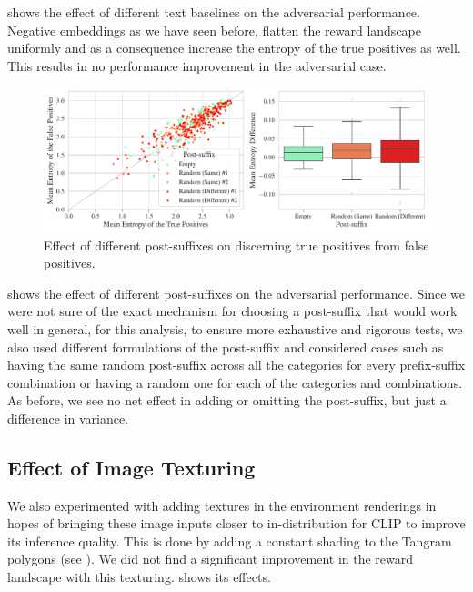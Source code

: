  shows the effect of different text baselines on the adversarial performance.
Negative embeddings as we have seen before, flatten the reward landscape uniformly and as a consequence increase the entropy of the true positives as well.
This results in no performance improvement in the adversarial case.

\begin{figure}[H]
    \centering
    \includegraphics[width=\textwidth]{images/post-suffix_adversarial_2.pdf}
    \caption{Effect of different post-suffixes on discerning true positives from false positives.}
    \label{fig:post-suffix-adversarial}
\end{figure}

 shows the effect of different post-suffixes on the adversarial performance.
Since we were not sure of the exact mechanism for choosing a post-suffix that would work well in general, for this analysis, to ensure more exhaustive and rigorous tests, we also used different formulations of the post-suffix and considered cases such as having the same random post-suffix across all the categories for every prefix-suffix combination or having a random one for each of the categories and combinations.
As before, we see no net effect in adding or omitting the post-suffix, but just a difference in variance.


\subsection{Effect of Image Texturing}
\label{sec:image-texturing}
We also experimented with adding textures in the environment renderings
in hopes of bringing these image inputs closer to in-distribution for CLIP to improve its inference quality.
This is done by adding a constant shading to the Tangram polygons (see ).
We did not find a significant improvement in the reward landscape with this texturing.
 shows its effects.

